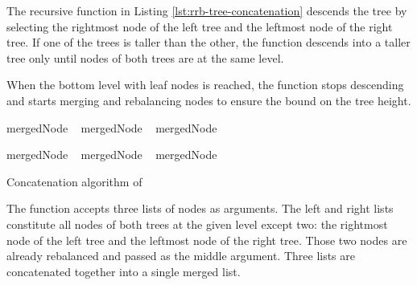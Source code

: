 The recursive function in Listing \ref{lst:rrb-tree-concatenation} descends the tree by selecting the rightmost node of the left tree and the leftmost node of the right tree. If one of the trees is taller than the other, the function descends into a taller tree only until nodes of both trees are at the same level.

When the bottom level with leaf nodes is reached, the function stops descending and starts merging and rebalancing nodes to ensure the  bound on the tree height.

\begin{listing}[!ht]
    \begin{algorithmic}[1]
                \State mergedNode \la\ 
                \State \Return {}
                \State mergedNode \la\ 
                \State \Return {}
            \Else
                \State mergedNode \la\ \nil{}

                    \State mergedNode \la\ 
                \Else
                        \State mergedNode \la\ 
                    \Else
                        \State mergedNode \la\ 
                    \EndIf
                \EndIf

                \State \Return {}
            \EndIf
        \EndFunction
    \end{algorithmic}

    \caption{Concatenation algorithm of \treerrb{}}
    \label{lst:rrb-tree-concatenation}
\end{listing}

The  function accepts three lists of nodes as arguments. The left and right lists constitute all nodes of both trees at the given level except two: the rightmost node of the left tree and the leftmost node of the right tree. Those two nodes are already rebalanced and passed as the middle argument. Three lists are concatenated together into a single merged list.

